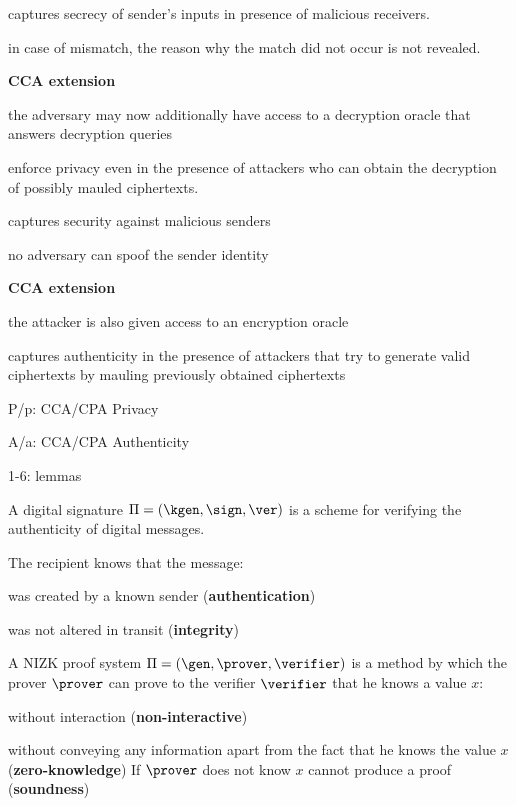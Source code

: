 \item captures secrecy of sender's inputs in presence of malicious receivers.
\item in case of mismatch, the reason why the match did not occur is not revealed.
\stopitemize

{\bf CCA extension}
\item the adversary may now additionally have access to a decryption
oracle that answers decryption queries
\item enforce privacy even in the presence of attackers who can obtain the decryption of possibly mauled ciphertexts.
\stopitemize
\stopslide

\item captures security against malicious senders
\item no adversary can spoof the sender identity
\stopitemize

{\bf CCA extension}
\item the attacker is also given access to an encryption oracle
\item captures authenticity in the presence of attackers that try to generate valid ciphertexts by mauling previously obtained ciphertexts
\stopitemize
\stopslide

\startslide[title={CCA Transformation Lattice}]
\startitemize[packed]
\item P/p: CCA/CPA Privacy
\item A/a: CCA/CPA Authenticity
\item 1-6: lemmas
\stopitemize
\startalignment[middle]
\dontleavehmode
{}
\stopalignment
\stopslide

\startslide[title={Digital Signatures}]
A digital signature $\Pi = (\kgen, \sign, \ver)$ is a scheme for verifying the authenticity of digital messages.

The recipient knows that the message:
\item was created by a known sender ({\bf authentication})
\item was not altered in transit ({\bf integrity})
\stopitemize
\stopslide

\startslide[title={Non-Interactive Zero-Knowledge}]
A NIZK proof system $\Pi = (\gen, \prover, \verifier)$ is a method by which the prover $\prover$ can prove to the verifier $\verifier$ that he knows a value $x$:
\startitemize
\item without interaction ({\bf non-interactive})
\item without conveying any information apart from the fact that he knows the value $x$ ({\bf zero-knowledge})
\stopitemize
If $\prover$ does not know $x$ cannot produce a proof ({\bf soundness})
\stopslide

